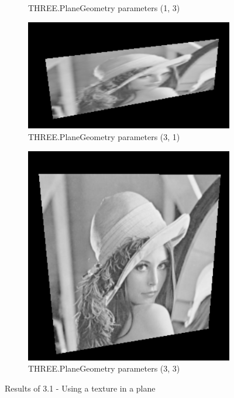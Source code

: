 \documentclass[12pt]{article}
\begin{document}
\begin{figure}[!h]
\begin{subfigure}{.33\textwidth}
        \caption{THREE.PlaneGeometry parameters (1, 3)}
        \label{fig:ex_31_1}
    \end{subfigure}%
    \begin{subfigure}{.33\textwidth}
        \centering
        \includegraphics[width = \textwidth]{figs/ex_31_2.png}
        \caption{THREE.PlaneGeometry parameters (3, 1)}
        \label{fig:ex_31_2}
    \end{subfigure}
    \begin{subfigure}{.33\textwidth}
        \centering
        \includegraphics[width = \textwidth]{figs/ex_31_3.png}
        \caption{THREE.PlaneGeometry parameters (3, 3)}
        \label{fig:ex_31_3}
    \end{subfigure}
\caption{Results of 3.1 - Using a texture in a plane}
\label{fig:ex_31}
\end{figure}
\end{document}
